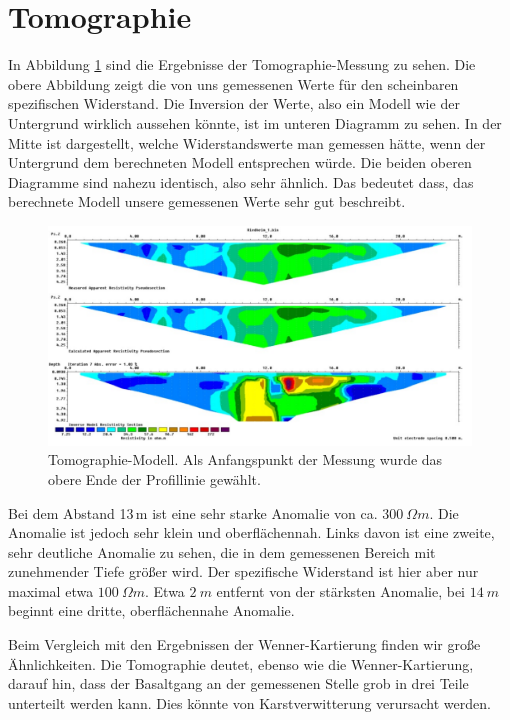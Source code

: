 \section{Tomographie}

In Abbildung \ref{abb:Tomographie} sind die Ergebnisse der Tomographie-Messung zu sehen. Die obere Abbildung zeigt die von uns gemessenen Werte für den scheinbaren spezifischen Widerstand. Die Inversion der Werte, also ein Modell wie der Untergrund 
wirklich aussehen könnte, ist im unteren Diagramm zu sehen. In der Mitte ist dargestellt, welche Widerstandswerte man gemessen hätte, wenn der Untergrund dem berechneten Modell entsprechen würde.
Die beiden oberen Diagramme sind nahezu identisch, also sehr ähnlich. Das bedeutet dass, das berechnete Modell unsere gemessenen Werte sehr gut beschreibt.

\begin{figure}[ht]
\centering
\includegraphics[width=\textwidth]{fig/Tomographie.pdf}
\caption[Tomographie-Modell]{Tomographie-Modell. Als Anfangspunkt der Messung wurde das obere Ende der Profillinie gewählt.}
\label{abb:Tomographie}
\end{figure}

Bei dem Abstand 13\,m ist eine sehr starke Anomalie von ca. $ \SI{300}{\Omega m}$. Die Anomalie ist jedoch sehr klein und oberflächennah. Links davon ist eine zweite, sehr deutliche Anomalie zu sehen, die in dem gemessenen Bereich
mit zunehmender Tiefe größer wird. Der spezifische Widerstand ist hier aber nur maximal etwa $\SI{100}{\Omega m}$.
Etwa $\SI{2}{m}$ entfernt von der stärksten Anomalie, bei  $\SI{14}{m}$ beginnt eine dritte, oberflächennahe Anomalie.

Beim Vergleich mit den Ergebnissen der Wenner-Kartierung finden wir große Ähnlichkeiten. Die Tomographie deutet, ebenso wie die Wenner-Kartierung, darauf hin, dass der Basaltgang an der gemessenen Stelle grob in drei Teile unterteilt werden kann. Dies könnte von Karstverwitterung verursacht werden.


